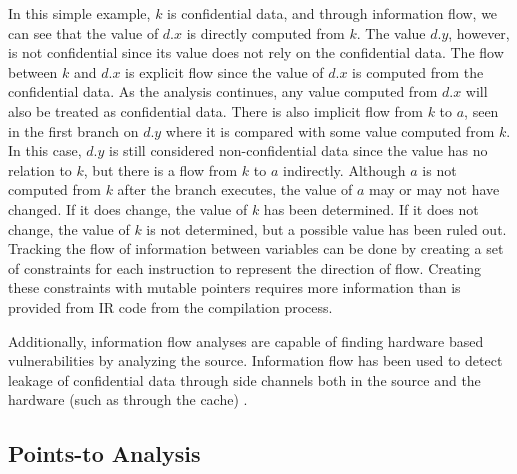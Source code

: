 In this simple example, $k$ is confidential data, and through information flow, we
can see that the value of $d.x$ is directly computed from $k$. The value $d.y$,
however, is not confidential since its value does not rely on the
confidential data. The flow between $k$ and $d.x$ is explicit flow
since the value of $d.x$ is computed from the confidential data. As the
analysis continues, any value computed from $d.x$ will also be
treated as confidential data. There is also implicit flow from $k$ to $a$, seen in
the first branch on $d.y$ where it is compared with some value computed from
$k$. In this case, $d.y$ is still considered non-confidential data since the
value has no relation to $k$, but there is a flow from $k$ to $a$ indirectly.
Although $a$ is not computed from $k$ after the branch executes, the value
of $a$ may or may not have changed. If it does change, the value of $k$ has been
determined. If it does not change, the value of $k$ is not determined, but a
possible value has been ruled out. Tracking the flow of information between variables can
be done by creating a set of constraints for each instruction to represent the
direction of flow. Creating these constraints with mutable pointers requires
more information than is provided from IR code from the compilation process.

Additionally, information flow analyses are capable of finding hardware based
vulnerabilities by analyzing the source. Information flow has been used to
detect leakage of confidential data through side channels both in the source and
the hardware (such as through the cache) \cite{DBLP:journals/corr/DoychevK16}.

\subsection{Points-to Analysis}

